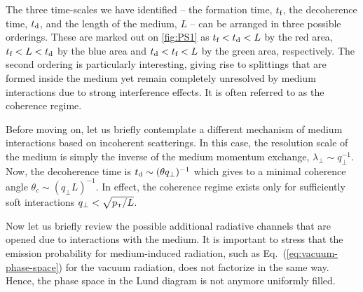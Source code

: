 The three time-scales we have identified -- the formation time, $t_\text{f}$, the decoherence time, $t_\text{d}$, and the length of the medium, $L$ -- can be arranged in three possible orderings. These are marked out on \autoref{fig:PS1} as $t_\text{f} < t_\text{d} < L $ by the red area, $t_\text{f} < L < t_\text{d}$ by the blue area and $t_\text{d} < t_\text{f} < L$ by the green area, respectively. 
The second ordering is particularly interesting, giving rise to splittings that are formed inside the medium yet remain completely unresolved by medium interactions due to strong interference effects. It is often referred to as the coherence regime.

Before moving on, let us briefly contemplate a different mechanism of medium interactions based on incoherent scatterings.
In this case, the resolution scale of the medium is simply the inverse of the medium momentum exchange, $\lambda_\perp \sim q_\perp^{-1}$. Now, the decoherence time is $t_\text{d} \sim (\theta q_\perp)^{-1}$ which gives to a minimal coherence angle $\theta_c \sim (q_\perp L)^{-1}$. In effect, the coherence regime exists only for sufficiently soft interactions $q_\perp < \sqrt{p_{\text{\tiny T}}/L}$.

Now let us briefly review the possible additional radiative channels that are opened due to interactions with the medium. It is important to stress that the emission probability for medium-induced radiation, such as Eq.~(\ref{eq:vacuum-phase-space}) for the vacuum radiation, does not factorize in the same way. Hence, the phase space in the Lund diagram is not anymore uniformly filled. 

